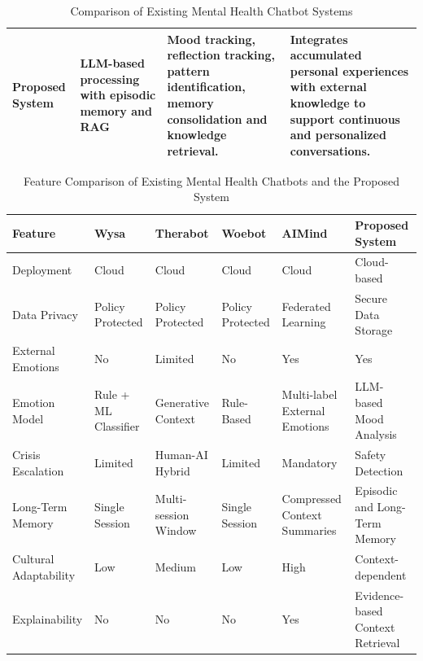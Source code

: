 \documentclass[conference]{IEEEtran}
\begin{document}
\begin{table}[!t]
\begin{tabular}{|m{2.8cm}|m{3.1cm}|m{4.2cm}|m{5cm}|}
\textbf{Proposed System} &
LLM-based processing with episodic memory and RAG &
Mood tracking, reflection tracking, pattern identification, memory consolidation and knowledge retrieval. &
Integrates accumulated personal experiences with external knowledge to support continuous and personalized conversations. \\
\hline

\end{tabular}
\caption{Comparison of Existing Mental Health Chatbot Systems}
\label{tab:literature}
\end{table}

\begin{table}[!t]
\centering
\scriptsize
\renewcommand{\arraystretch}{1.4}
\setlength{\tabcolsep}{5pt}

\begin{tabular}{|
>{\centering\arraybackslash}p{}|
>{\centering\arraybackslash}p{}|
>{\centering\arraybackslash}p{}|
>{\centering\arraybackslash}p{}|
>{\centering\arraybackslash}p{}|
>{\centering\arraybackslash}p{}|}
\hline

\textbf{Feature} &
\textbf{Wysa} &
\textbf{Therabot} &
\textbf{Woebot} &
\textbf{AIMind} &
\textbf{Proposed System} \\
\hline

Deployment &
Cloud &
Cloud &
Cloud &
Cloud &
Cloud-based \\
\hline

Data Privacy &
Policy Protected &
Policy Protected &
Policy Protected &
Federated Learning &
Secure Data Storage \\
\hline

External Emotions &
No &
Limited &
No &
Yes &
Yes \\
\hline

Emotion Model &
Rule + ML Classifier &
Generative Context &
Rule-Based &
Multi-label External Emotions &
LLM-based Mood Analysis \\
\hline

Crisis Escalation &
Limited &
Human-AI Hybrid &
Limited &
Mandatory &
Safety Detection \\
\hline

Long-Term Memory &
Single Session &
Multi-session Window &
Single Session &
Compressed Context Summaries &
Episodic and Long-Term Memory \\
\hline

Cultural Adaptability &
Low &
Medium &
Low &
High &
Context-dependent \\
\hline

Explainability &
No &
No &
No &
Yes &
Evidence-based Context Retrieval \\
\hline

\end{tabular}
\caption{Feature Comparison of Existing Mental Health Chatbots and the Proposed System \cite{b7}}
\label{tab:chatbot_comparison}
\end{table}
\end{document}
